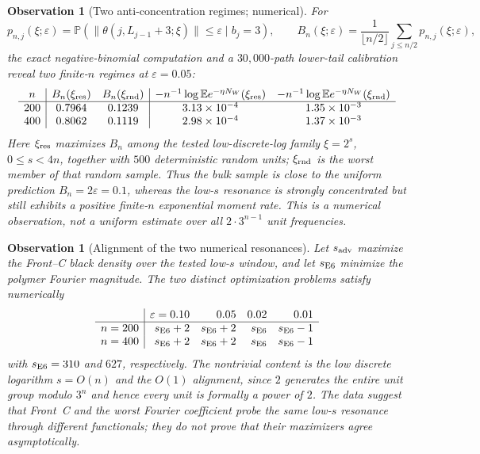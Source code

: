 \documentclass[12pt,a4paper]{article}
\newtheorem{observation}[theorem]{Observation}
\begin{document}
\begin{observation}[Two anti-concentration regimes; numerical]
\label{obs:two_ac_regimes}
For
\[
p_{n,j}(\xi;\varepsilon)=\mathbb P\!\left(\|\theta(j,L_{j-1}+3;\xi)\|
\le\varepsilon\mid b_j=3\right),\qquad
B_n(\xi;\varepsilon)=\frac1{\lfloor n/2\rfloor}\sum_{j\le n/2}p_{n,j}(\xi;\varepsilon),
\]
the exact negative-binomial computation and a $30{,}000$-path lower-tail
calibration reveal two finite-$n$ regimes at $\varepsilon=0.05$:
\[
\begin{array}{c|cc|cc}
 n & B_n(\xi_{\rm res}) & B_n(\xi_{\rm rnd})
   & -n^{-1}\log\mathbb E e^{-\eta N_W}(\xi_{\rm res})
   & -n^{-1}\log\mathbb E e^{-\eta N_W}(\xi_{\rm rnd})\\ \hline
 200&0.7964&0.1239&3.13\times10^{-4}&1.35\times10^{-3}\\
 400&0.8062&0.1119&2.98\times10^{-4}&1.37\times10^{-3}
\end{array}
\]
Here $\xi_{\rm res}$ maximizes $B_n$ among the tested low-discrete-log family
$\xi=2^s$, $0\le s<4n$, together with $500$ deterministic random units;
$\xi_{\rm rnd}$ is the worst member of that random sample.  Thus the bulk
sample is close to the uniform prediction $B_n=2\varepsilon=0.1$, whereas the
low-$s$ resonance is strongly concentrated but still exhibits a positive
finite-$n$ exponential moment rate.  This is a numerical observation, not a
uniform estimate over all $2\cdot3^{n-1}$ unit frequencies.
\end{observation}

\begin{observation}[Alignment of the two numerical resonances]
\label{obs:resonance_alignment}
Let $s_{\rm adv}$ maximize the Front--C black density over the tested low-$s$
window, and let $s_{\rm E6}$ minimize the polymer Fourier magnitude.  The two
distinct optimization problems satisfy numerically
\[
\begin{array}{c|rrrr}
 &\varepsilon=0.10&0.05&0.02&0.01\\ \hline
 n=200&s_{\rm E6}+2&s_{\rm E6}+2&s_{\rm E6}&s_{\rm E6}-1\\
 n=400&s_{\rm E6}+2&s_{\rm E6}+2&s_{\rm E6}&s_{\rm E6}-1
\end{array}
\]
with $s_{\rm E6}=310$ and $627$, respectively.  The nontrivial content is the
low discrete logarithm $s=O(n)$ and the $O(1)$ alignment, since $2$ generates
the entire unit group modulo $3^n$ and hence every unit is formally a power of
$2$.  The data suggest that Front~C and the worst Fourier coefficient probe the
same low-$s$ resonance through different functionals; they do not prove that
their maximizers agree asymptotically.
\end{observation}
\end{document}
